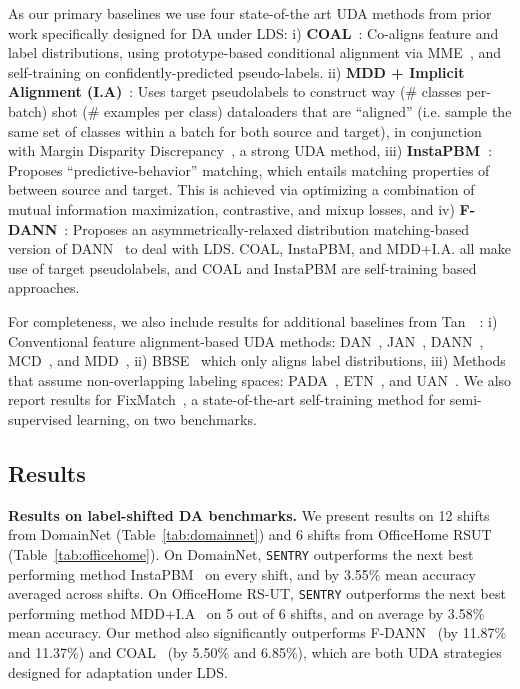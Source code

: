 \documentclass[10pt,twocolumn,letterpaper]{article}
\newcommand{\method}{\texttt{SENTRY}\xspace}
\begin{document}
\noindent As our primary baselines we use four state-of-the art UDA methods from prior work specifically designed for DA under LDS: i) \textbf{COAL}~\cite{tan2019generalized}: Co-aligns feature and label distributions, using prototype-based conditional alignment via MME~\cite{saito2019semi}, and self-training on confidently-predicted pseudo-labels. ii) \textbf{MDD + Implicit Alignment (I.A)}~\cite{jiang2020implicit}: Uses target pseudolabels to construct way (\# classes per-batch) shot (\# examples per class) dataloaders that are ``aligned'' (i.e. sample the same set of classes within a batch for both source and target), in conjunction with Margin Disparity Discrepancy~\cite{zhang2019bridging}, a strong UDA method, iii) \textbf{InstaPBM~\cite{li2020rethinking}}: Proposes ``predictive-behavior'' matching, which entails matching properties of  between source and target. This is achieved via optimizing a combination of mutual information maximization, contrastive, and mixup losses, and iv) \textbf{F-DANN}~\cite{wu2019domain}: Proposes an asymmetrically-relaxed distribution matching-based version of DANN~\cite{ganin2014unsupervised} to deal with LDS. COAL, InstaPBM, and MDD+I.A. all make use of target pseudolabels, and COAL and InstaPBM are self-training based approaches.

For completeness, we also include results for additional baselines from Tan~\etal~\cite{tan2019generalized}: i) Conventional feature alignment-based UDA methods: DAN~\cite{long2015learning}, JAN~\cite{long2017deep}, DANN~\cite{ganin2014unsupervised}, MCD~\cite{saito2019semi}, and MDD~\cite{zhang2019bridging}, ii) BBSE~\cite{li2020rethinking} which only aligns label distributions, iii) Methods that assume non-overlapping labeling spaces: PADA~\cite{cao2018partial}, ETN~\cite{cao2019learning}, and UAN~\cite{you2019universal}. We also report results for FixMatch~\cite{sohn2020fixmatch}, a state-of-the-art self-training method for semi-supervised learning, on two benchmarks.


\vspace{-5pt}
\subsection{Results}
\label{ref:results}


\noindent \textbf{Results on label-shifted DA benchmarks.} We present results on 12 shifts from DomainNet (Table~\ref{tab:domainnet}) and 6 shifts from OfficeHome RSUT (Table~\ref{tab:officehome}). On DomainNet, \method outperforms the next best performing method InstaPBM~\cite{li2020rethinking} on every shift, and by 3.55\% mean accuracy averaged across shifts. On OfficeHome RS-UT, \method outperforms the next best performing method MDD+I.A~\cite{jiang2020implicit} on 5 out of 6 shifts, and on average by 3.58\% mean accuracy. Our method also significantly outperforms F-DANN~\cite{wu2019domain} (by 11.87\% and 11.37\%) and COAL~\cite{tan2019generalized} (by 5.50\% and 6.85\%), which are both UDA strategies designed for adaptation under LDS.
\end{document}
